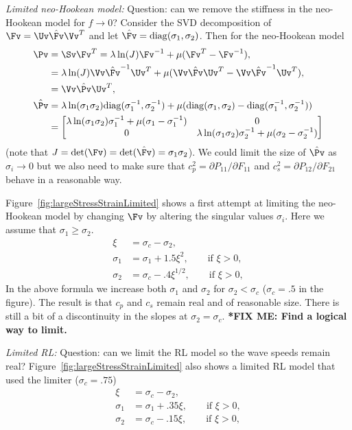\newcommand{\diag}{{\rm diag}}
{\em Limited neo-Hookean model:} Question: can we remove the stiffness in the neo-Hookean model for $f\rightarrow 0$?
Consider the SVD  decomposition of $\Fv = \Uv \Fvhat \Vv^T$ and let $\Fvhat=\diag(\sigma_1,\sigma_2)$. Then for the neo-Hookean model
\begin{align}
   \Pv &= \Sv \Fv^T =  \lambda \ln(J) \Fv^{-1} + \mu( \Fv^T - \Fv^{-1} ) ,\\
       &= \lambda \ln(J) \Vv \Fvhat^{-1}\Uv^T + \mu( \Vv \Fvhat\Uv^T - \Vv \Fvhat^{-1}\Uv^T ),\\
       &= \Vv \Pvhat \Uv^T, \\
  \Pvhat &= \lambda \ln(\sigma_1\sigma_2) \diag(\sigma_1^{-1},\sigma_2^{-1}) + \mu(  \diag(\sigma_1,\sigma_2) - \diag(\sigma_1^{-1},\sigma_2^{-1}) ) \\
        &= \begin{bmatrix}
             \lambda \ln(\sigma_1\sigma_2) \sigma_1^{-1} + \mu(\sigma_1-\sigma_1^{-1}) & 0 \\
               0 & \lambda \ln(\sigma_1\sigma_2) \sigma_2^{-1} + \mu(\sigma_2-\sigma_2^{-1})
          \end{bmatrix}
\end{align}
(note that $J=\det(\Fv)=\det(\Fvhat)=\sigma_1\sigma_2$).  
We could limit the size of $\Pvhat$ as $\sigma_i\rightarrow 0$ but we also need to make
sure that $c_p^2=\partial P_{11}/\partial F_{11}$ and $c_s^2=\partial P_{12}/\partial F_{21}$ behave in a reasonable way.

Figure~\ref{fig:largeStressStrainLimited} shows a first attempt at limiting the neo-Hookean model by
changing $\Fv$ by altering the singular values $\sigma_i$. Here we assume that $\sigma_1\ge \sigma_2$. 
\begin{align}
      \xi &= \sigma_c-\sigma_2, \\ 
      \sigma_1 &=\sigma_1 + 1.5 \xi^2, \qquad\text{if $\xi>0$}, \\
      \sigma_2 &=\sigma_c - .4 \xi^{1/2}, \qquad\text{if $\xi>0$},
\end{align}
In the above formula we increase both $\sigma_1$ and $\sigma_2$ for $\sigma_2<\sigma_c$ ($\sigma_c=.5$ in the figure).
The result is that $c_p$ and $c_s$ remain real and of reasonable size. There is still a bit of a
discontinuity in the slopes at $\sigma_2 = \sigma_c$.  {\bf **FIX ME:  Find a logical way to limit.}

{\em Limited RL:} Question: can we limit the RL model so the wave speeds remain real?
Figure~\ref{fig:largeStressStrainLimited} also shows a limited RL model that used the limiter ($\sigma_c=.75$)
\begin{align}
      \xi &= \sigma_c-\sigma_2, \\ 
      \sigma_1 &=\sigma_1 + .35 \xi, \qquad\text{if $\xi>0$}, \\
      \sigma_2 &=\sigma_c - .15 \xi, \qquad\text{if $\xi>0$},
\end{align}

